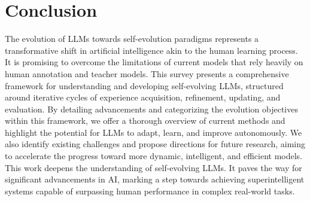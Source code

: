 \documentclass[sn-basic, Numbered]{sn-jnl}%
\theoremstyle{thmstyleone}%
\theoremstyle{thmstyletwo}%
\theoremstyle{thmstylethree}%
\begin{document}






% 
\section{Conclusion}
\label{sec:conclusion}
The evolution of LLMs towards self-evolution paradigms represents a transformative shift in artificial intelligence akin to the human learning process. It is promising to overcome the limitations of current models that rely heavily on human annotation and teacher models. 
This survey presents a comprehensive framework for understanding and developing self-evolving LLMs, structured around iterative cycles of experience acquisition, refinement, updating, and evaluation. By detailing advancements and categorizing the evolution objectives within this framework, we offer a thorough overview of current methods and highlight the potential for LLMs to adapt, learn, and improve autonomously. 
We also identify existing challenges and propose directions for future research, aiming to accelerate the progress toward more dynamic, intelligent, and efficient models. This work deepens the understanding of self-evolving LLMs. It paves the way for significant advancements in AI, marking a step towards achieving superintelligent systems capable of surpassing human performance in complex real-world tasks.


\end{document}

